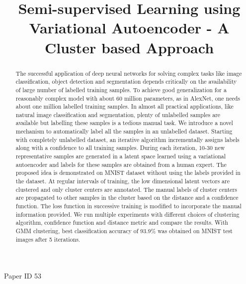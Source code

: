 \documentclass[runningheads]{llncs}
\begin{document}
\title{Semi-supervised Learning using Variational Autoencoder - A Cluster based Approach}
%
%
\maketitle              %
%
Paper ID 53

\begin{abstract}
    The successful application of deep neural networks for solving complex tasks like image classification, object detection and segmentation depends critically on the availability of large number of labelled training samples. To achieve good generalization for a reasonably complex model with about 60 million parameters, as in AlexNet, one needs about one million labelled training samples. In almost all practical applications, like natural image classification and segmentation,  plenty of unlabelled samples are available but labelling these samples is a tedious manual task.
We introduce a novel mechanism to automatically label all the samples in an unlabelled dataset.
    Starting with completely unlabelled dataset, an iterative algorithm incrementally assigns labels along with a confidence to all training samples.
    During each iteration, 10-30 new representative samples are generated in a latent space learned using a variational autoencoder and labels for these samples are obtained from a human expert.
The proposed  idea  is demonstrated on MNIST dataset without using the labels provided in the dataset.
At regular intervals of training, the low dimensional latent vectors are clustered and only cluster centers are annotated.
    The manual labels of cluster centers are propagated to other samples in the cluster based on the distance and a confidence function.
The loss function in successive training is modified to incorporate the manual information provided.
    We run multiple experiments with different choices of clustering algorithm, confidence function and distance metric and compare the results.
With GMM clustering, best classification accuracy of 93.9\% was obtained on MNIST test images after 5 iterations.

\end{abstract}
%
%
%
\end{document}
